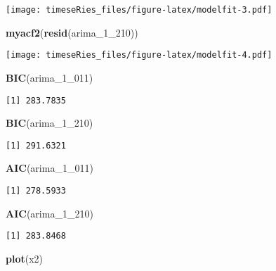 \documentclass[]{book}
\newenvironment{Shaded}{\begin{snugshade}}{\end{snugshade}}
\newcommand{\KeywordTok}[1]{\textcolor[rgb]{0.13,0.29,0.53}{\textbf{#1}}}
\newcommand{\DecValTok}[1]{\textcolor[rgb]{0.00,0.00,0.81}{#1}}
\newcommand{\NormalTok}[1]{#1}
\begin{document}
\texttt{[image: timeseRies\_files/figure-latex/modelfit-3.pdf]}

\begin{Shaded}
\begin{Highlighting}[]
\KeywordTok{myacf2}\NormalTok{(}\KeywordTok{resid}\NormalTok{(arima_1_}\DecValTok{210}\NormalTok{))}
\end{Highlighting}
\end{Shaded}

\texttt{[image: timeseRies\_files/figure-latex/modelfit-4.pdf]}

\begin{Shaded}
\begin{Highlighting}[]
\KeywordTok{BIC}\NormalTok{(arima_1_}\DecValTok{011}\NormalTok{)}
\end{Highlighting}
\end{Shaded}

\begin{verbatim}
[1] 283.7835
\end{verbatim}

\begin{Shaded}
\begin{Highlighting}[]
\KeywordTok{BIC}\NormalTok{(arima_1_}\DecValTok{210}\NormalTok{)}
\end{Highlighting}
\end{Shaded}

\begin{verbatim}
[1] 291.6321
\end{verbatim}

\begin{Shaded}
\begin{Highlighting}[]
\KeywordTok{AIC}\NormalTok{(arima_1_}\DecValTok{011}\NormalTok{)}
\end{Highlighting}
\end{Shaded}

\begin{verbatim}
[1] 278.5933
\end{verbatim}

\begin{Shaded}
\begin{Highlighting}[]
\KeywordTok{AIC}\NormalTok{(arima_1_}\DecValTok{210}\NormalTok{)}
\end{Highlighting}
\end{Shaded}

\begin{verbatim}
[1] 283.8468
\end{verbatim}

\begin{Shaded}
\begin{Highlighting}[]
\KeywordTok{plot}\NormalTok{(x2)}
\end{Highlighting}
\end{Shaded}
\end{document}
